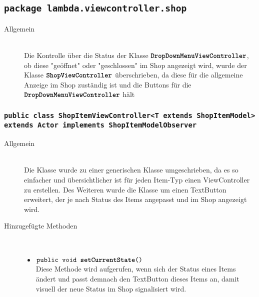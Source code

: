 \subsection{\texttt{package lambda.viewcontroller.shop}}

\begin{description}
\item[Allgemein] \hfill \\ Die Kontrolle über die Status der Klasse $\texttt{\textbf{DropDownMenuViewController}}$, ob diese "geöffnet" oder "geschlossen" im Shop angezeigt wird, wurde der Klasse $\texttt{\textbf{ShopViewController}}$ überschrieben, da diese für die allgemeine Anzeige im Shop zuständig ist und die Buttons für die $\texttt{\textbf{DropDownMenuViewController}}$ hält
\end{description}

\subsubsection{\normalfont \texttt{public class \textbf{ShopItemViewController}<T extends ShopItemModel> extends Actor implements ShopItemModelObserver}}

\begin{description}

\item[Allgemein] \hfill \\ Die Klasse wurde zu einer generischen Klasse umgeschrieben, da es so einfacher und übersichtlicher ist für jeden Item-Typ einen ViewController zu erstellen. Des Weiteren wurde die Klasse um einen TextButton erweitert, der je nach Status des Items angepasst und im Shop angezeigt wird.

\item[Hinzugefügte Methoden] \hfill \\
	\vspace{-.8cm}
	\begin{itemize}
		\item $\texttt{public void \textbf{setCurrentState}()}$ \\ Diese Methode wird aufgerufen, wenn sich der Status eines Items ändert und passt demnach den TextButton dieses Items an, damit visuell der neue Status im Shop signalisiert wird.
\end{itemize}
\end{description}